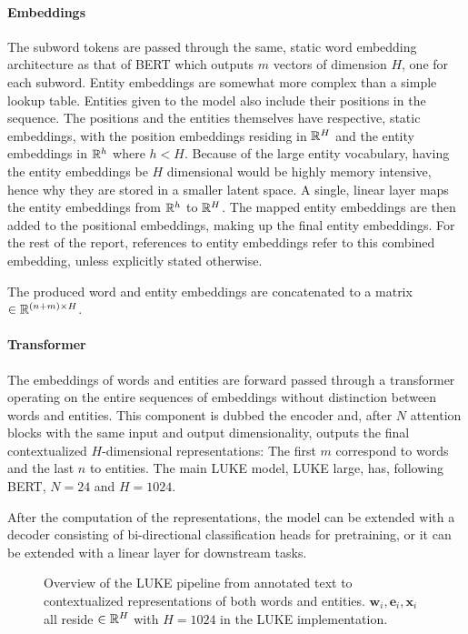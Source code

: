 \documentclass[main.tex]{subfiles}
\begin{document}
\paragraph{Embeddings}
The subword tokens are passed through the same, static word embedding architecture as that of BERT which outputs $m$ vectors of dimension $H$, one for each subword.
Entity embeddings are somewhat more complex than a simple lookup table.
Entities given to the model also include their positions in the sequence.
The positions and the entities themselves have respective, static embeddings, with the position embeddings residing in $ \mathbb R^H $ and the entity embeddings in $ \mathbb R^h $ where $ h<H $.
Because of the large entity vocabulary, having the entity embeddings be $ H $ dimensional would be highly memory intensive, hence why they are stored in a smaller latent space.
A single, linear layer maps the entity embeddings from $ \mathbb R^h $ to $ \mathbb R^H $.
The mapped entity embeddings are then added to the positional embeddings, making up the final entity embeddings.
For the rest of the report, references to entity embeddings refer to this combined embedding, unless explicitly stated otherwise.

The produced word and entity embeddings are concatenated to a matrix $\in \mathbb R^{(n+m)\times H}$.

\paragraph{Transformer}
The embeddings of words and entities are forward passed through a transformer operating on the entire sequences of embeddings without distinction between words and entities.
This component is dubbed the encoder and, after $N$ attention blocks with the same input and output dimensionality, outputs the final contextualized $H$-dimensional representations:
The first $m$ correspond to words and the last $n$ to entities.
The main LUKE model, LUKE large, has, following BERT, $N=24$ and $H=1024$.

After the computation of the representations, the model can be extended with a decoder consisting of bi-directional classification heads for pretraining, or it can be extended with a linear layer for downstream tasks.
\begin{figure}[H]
    \centering
        
    \caption{
        Overview of the LUKE pipeline from annotated text to contextualized representations of both words and entities.
        $\mathbf w_i, \mathbf e_i, \mathbf x_i$ all reside $\in \mathbb R^H$ with $H=1024$ in the LUKE implementation.
    }
    \label{fig:luke}
\end{figure}\noindent
\end{document}
